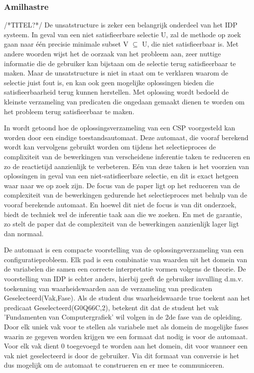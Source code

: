 \subsubsection{Amilhastre} /*TITEL?*/
De unsatstructure is zeker een belangrijk onderdeel van het IDP systeem. In geval van een niet satisfieerbare selectie U, zal de methode op zoek gaan naar \'{e}\'{e}n precisie minimale subset V $\subseteq$ U, die niet satisfieerbaar is. Met andere woorden wijst het de oorzaak van het probleem aan, zeer nuttige informatie die de gebruiker kan bijstaan om de selectie terug satisfieerbaar te maken. Maar de unsatstructure is niet in staat om te verklaren waarom de selectie juist fout is, en kan ook geen mogelijke oplossingen bieden die satisfieerbaarheid terug kunnen herstellen. Met oplossing wordt bedoeld de kleinste verzameling van predicaten die ongedaan gemaakt dienen te worden om het probleem terug satisfieerbaar te maken. 

In \citep{amilhastre2002consistency} wordt getoond hoe de oplossingsverzameling van een CSP voorgesteld kan worden door een eindige toestandsautomaat. Deze automaat, die vooraf berekend wordt kan vervolgens gebruikt worden om tijdens het selectieproces de complixiteit van de bewerkingen van verscheidene inferentie taken te reduceren en zo de reactietijd aanzienlijk te verbeteren. E\'{e}n van deze taken is het voorzien van oplossingen in geval van een niet-satisfieerbare selectie, en dit is exact hetgeen waar naar we op zoek zijn. De focus van de paper ligt op het reduceren van de complexiteit van de bewerkingen gedurende het selectieproces met behulp van de vooraf berekende automaat. En hoewel dit niet de focus is van dit onderzoek, biedt de techniek wel de inferentie taak aan die we zoeken. En met de garantie, zo stelt de paper dat de complexiteit van de bewerkingen aanzienlijk lager ligt dan normaal. 

De automaat is een compacte voorstelling van de oplossingsverzameling van een configuratieprobleem. Elk pad is een combinatie van waarden uit het domein van de variabelen die samen een correcte interpretatie vormen volgens de theorie. De voorstelling van IDP is echter anders, hierbij geeft de gebruiker invulling d.m.v. toekenning van waarheidswaarden aan de verzameling van predicaten Geselecteerd(Vak,Fase). Als de student dus waarheidswaarde true toekent aan het predicaat Geselecteerd(G0Q66C,2), betekent dit dat de student het vak 'Fundamenten van Computergrafiek' wil volgen in de 2de fase van de opleiding. Door elk uniek vak voor te stellen als variabele met als domein de mogelijke fases waarin ze gegeven worden krijgen we een formaat dat nodig is voor de automaat. Voor elk vak dient 0 toegevoegd te worden aan het domein, dit voor wanneer een vak niet geselecteerd is door de gebruiker. Via dit formaat van conversie is het dus mogelijk om de automaat te construeren en er mee te communiceren.

